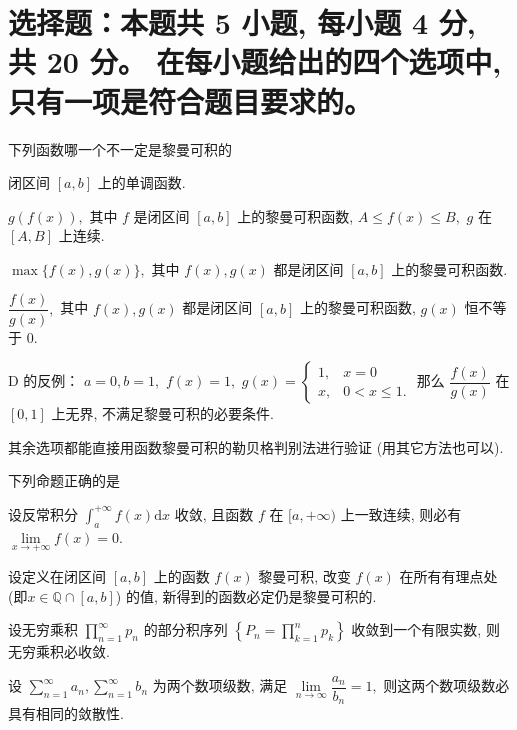 \section{%
  选择题：本题共 5 小题, 每小题 4 分, 共 20 分。
  在每小题给出的四个选项中, 只有一项是符合题目要求的。
}


\begin{question}
  下列函数哪一个不一定是黎曼可积的 \paren[D]

  \begin{choices}
    \item 闭区间 $[a, b]$ 上的单调函数.
    \item $g(f(x)),$ 其中 $f$ 是闭区间 $[a, b]$ 上的黎曼可积函数, $A \leqslant f(x) \leqslant B,$ $g$ 在 $[A, B]$ 上连续.
    \item $\max\{f(x), g(x)\},$ 其中 $f(x), g(x)$ 都是闭区间 $[a, b]$ 上的黎曼可积函数.
    \item $\dfrac{f(x)}{g(x)},$ 其中 $f(x), g(x)$ 都是闭区间 $[a, b]$ 上的黎曼可积函数, $g(x)$ 恒不等于 $0.$
  \end{choices}
\end{question}

\begin{solution}
  D 的反例： $a = 0, b = 1,$ $f(x) = 1,$ $g(x) = \begin{cases}
    1, & x = 0 \\ x, & 0 < x \leqslant 1.
  \end{cases}$ 那么 $\dfrac{f(x)}{g(x)}$ 在 $[0, 1]$ 上无界, 不满足黎曼可积的必要条件.

  其余选项都能直接用函数黎曼可积的勒贝格判别法进行验证 (用其它方法也可以).
\end{solution}

\begin{question}
  下列命题正确的是 \paren[A]

  \begin{choices}
    \item 设反常积分 $\int_a^{+\infty} f(x) \mathrm{d} x$ 收敛, 且函数 $f$ 在 $[a, +\infty)$ 上一致连续, 则必有 $\lim\limits_{x \to +\infty} f(x) = 0.$
    \item 设定义在闭区间 $[a, b]$ 上的函数 $f(x)$ 黎曼可积, 改变 $f(x)$ 在所有有理点处 (即$x \in \mathbb{Q} \cap [a, b]$) 的值, 新得到的函数必定仍是黎曼可积的.
    \item 设无穷乘积 $\prod\limits_{n=1}^{\infty} p_n$ 的部分积序列 $\left\{ P_n = \prod\limits_{k=1}^{n} p_k \right\}$ 收敛到一个有限实数, 则无穷乘积必收敛.
    \item 设 $\sum\limits_{n=1}^{\infty} a_n, \sum\limits_{n=1}^{\infty} b_n$ 为两个数项级数, 满足 $\lim\limits_{n\to\infty} \dfrac{a_n}{b_n} = 1,$ 则这两个数项级数必具有相同的敛散性.
  \end{choices}
\end{question}

